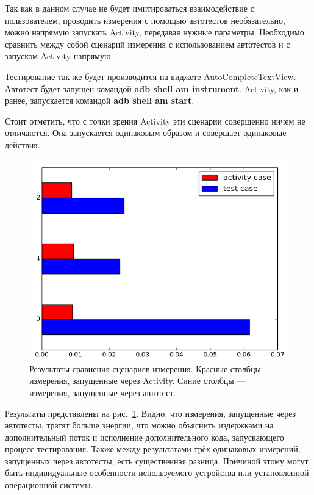 \documentclass[a4paper,14pt]{extarticle} %
\begin{document}
	Так как в данном случае не будет имитироваться взаимодействие с пользователем, проводить измерения с помощью автотестов необязательно, можно напрямую запускать Activity, передавая нужные параметры. Необходимо сравнить между собой сценарий измерения с использованием автотестов и с запуском Activity напрямую.
	
	Тестирование так же будет производится на виджете AutoCompleteTextView. Автотест будет запущен командой \textbf{adb shell am instrument}. Activity, как и ранее, запускается командой \textbf{adb shell am start}.
	
	Стоит отметить, что с точки зрения Activity эти сценарии совершенно ничем не отличаются. Она запускается одинаковым образом и совершает одинаковые действия.
	
	\begin{figure}[tbh]
		\includegraphics[width=\textwidth]{test_comparation}
		\caption{Результаты сравнения  сценариев измерения. Красные столбцы --- измерения, запущенные через Activity. Синие столбцы --- измерения, запущенные через автотест.}
		\label{fig:test_comparation}
	\end{figure}

	Результаты представлены на рис.~\ref{fig:test_comparation}. Видно, что измерения, запущенные через автотесты, тратят больше энергии, что можно объяснить издержками на дополнительный поток и исполнение дополнительного кода, запускающего процесс тестирования. Также между результатами трёх одинаковых измерений, запущенных через автотесты, есть существенная разница. Причиной этому могут быть индивидуальные особенности используемого устройства или установленной операционной системы.
	
\end{document}
